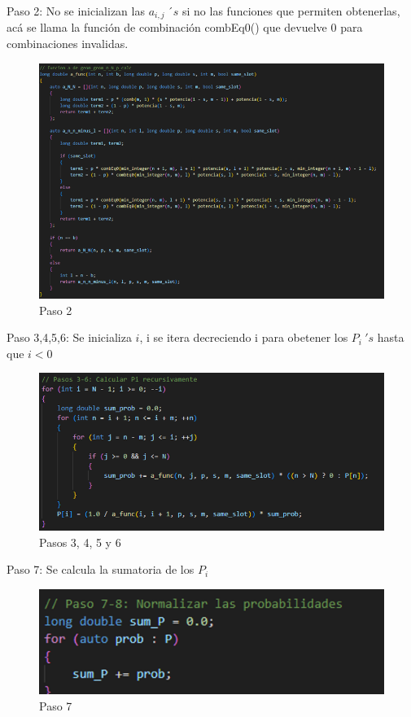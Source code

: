 \documentclass{article}
\begin{document}
Paso 2: No se inicializan las $a_{i,j}\ ´s$ si no las funciones que permiten obtenerlas, acá se llama la función de combinación combEq0() que devuelve 0 para combinaciones invalidas.
\begin{figure}[H]
    \centering
    \includegraphics[width=0.75\linewidth]{images/imageGeoGeoMCalc6.png}
    \caption{Paso 2}
    \label{fig:enter-label}
\end{figure}

Paso 3,4,5,6: Se inicializa $i$, i se itera decreciendo i para obetener los $P_i \ 's$ hasta que $i<0$

\begin{figure}[H]
    \centering
    \includegraphics[width=0.75\linewidth]{images/imageGeoGeoMCalc7.png}
    \caption{Pasos 3, 4, 5 y 6}
    \label{fig:enter-label}
\end{figure}

Paso 7: Se calcula la sumatoria de los $P_i$
\begin{figure}[H]
    \centering
    \includegraphics[width=0.75\linewidth]{images/imageGeoGeoMCalc8.png}
    \caption{Paso 7}
    \label{fig:enter-label}
\end{figure}
\end{document}
